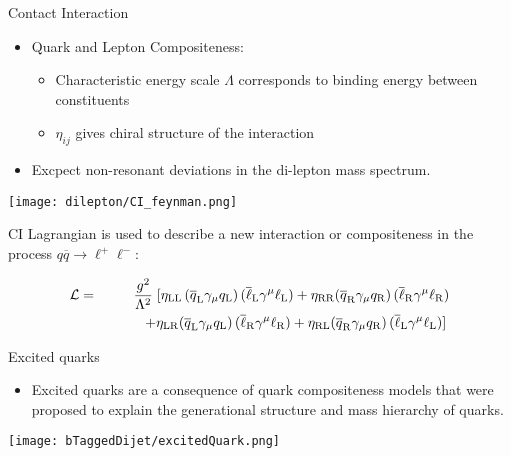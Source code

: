\documentclass[8pt]{beamer}
\begin{document}
\begin{frame}{\large Contact Interaction}
  
  \begin{itemize}
    \item Quark and Lepton Compositeness:
    \begin{itemize}
      \item Characteristic energy scale $\varLambda$ corresponds to binding energy between constituents
      \item $\eta_{ij}$ gives chiral structure of the interaction
    \end{itemize}
    \item Excpect non-resonant deviations in the di-lepton mass spectrum.
  \end{itemize}

{\centering
  \texttt{[image: dilepton/CI\_feynman.png]}\\
}

CI Lagrangian is used to describe a new interaction or compositeness in the process $q\overline{q} \to \ell^+\ell^-$:

\begin{eqnarray}\label{lagrangian}
\mathcal L & = & \frac{g^2}{\Lambda^2}\;[ \eta_{\rm LL} \, (\overline q_{\rm L}\gamma_{\mu} q_{\rm L})\,(\overline\ell_{\rm L}\gamma^{\mu}\ell_{\rm L})
+\eta_{\rm RR} (\overline q_{\rm R}\gamma_{\mu} q_{\rm R}) \,(\overline\ell_{\rm R}\gamma^{\mu}\ell_{\rm R}) \\ \nonumber
&  & ~~~~~~~~ +\eta_{\rm LR} (\overline q_{\rm L}\gamma_{\mu} q_{\rm L}) \,(\overline\ell_{\rm R}\gamma^{\mu}\ell_{\rm R})
+\eta_{\rm RL} (\overline q_{\rm R}\gamma_{\mu} q_{\rm R}) \,(\overline\ell_{\rm L}\gamma^{\mu}\ell_{\rm L}) ] \:
\end{eqnarray}


\end{frame}
\begin{frame}{\large Excited quarks}
  
  \begin{itemize}
   \item Excited quarks are a consequence of quark compositeness models that were proposed to explain the generational structure and mass hierarchy of quarks.

  \end{itemize}

  {\centering
  \texttt{[image: bTaggedDijet/excitedQuark.png]}\\
  }

\end{frame}
\end{document}
